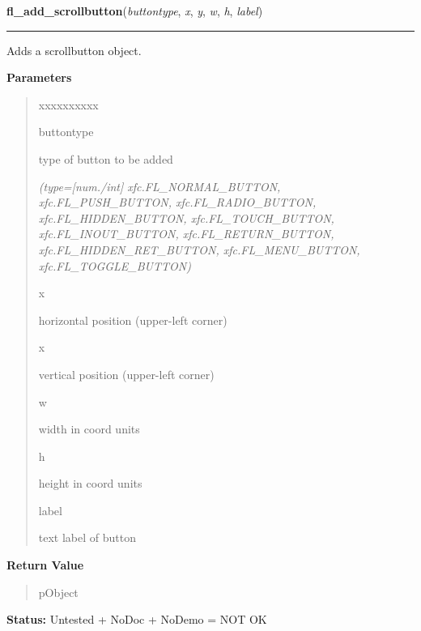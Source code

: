 \hspace{.8\funcindent}\begin{boxedminipage}{\funcwidth}

    \raggedright \textbf{fl\_add\_scrollbutton}(\textit{buttontype}, \textit{x}, \textit{y}, \textit{w}, \textit{h}, \textit{label})

    \vspace{-1.5ex}

    \rule{\textwidth}{0.5\fboxrule}
\setlength{\parskip}{2ex}
    Adds a scrollbutton object.

\setlength{\parskip}{1ex}
      \textbf{Parameters}
      \vspace{-1ex}

      \begin{quote}
        \begin{Ventry}{xxxxxxxxxx}

          \item[buttontype]

          type of button to be added

            {\it (type=[num./int] xfc.FL\_NORMAL\_BUTTON, xfc.FL\_PUSH\_BUTTON, 
xfc.FL\_RADIO\_BUTTON, xfc.FL\_HIDDEN\_BUTTON, xfc.FL\_TOUCH\_BUTTON, 
xfc.FL\_INOUT\_BUTTON, xfc.FL\_RETURN\_BUTTON, xfc.FL\_HIDDEN\_RET\_BUTTON,
xfc.FL\_MENU\_BUTTON, xfc.FL\_TOGGLE\_BUTTON)}

          \item[x]

          horizontal position (upper-left corner)

          \item[x]

          vertical position (upper-left corner)

          \item[w]

          width in coord units

          \item[h]

          height in coord units

          \item[label]

          text label of button

        \end{Ventry}

      \end{quote}

      \textbf{Return Value}
    \vspace{-1ex}

      \begin{quote}
      pObject

      \end{quote}

\textbf{Status:} Untested + NoDoc + NoDemo = NOT OK



    \end{boxedminipage}

